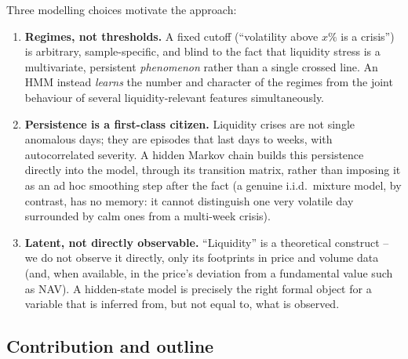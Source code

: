 \documentclass[11pt]{article}
\theoremstyle{definition}
\theoremstyle{remark}
\begin{document}
Three modelling choices motivate the approach:
\begin{enumerate}
    \item \textbf{Regimes, not thresholds.} A fixed cutoff (``volatility above $x\%$ is a crisis'') is arbitrary, sample-specific, and blind to the fact that liquidity stress is a multivariate, persistent \emph{phenomenon} rather than a single crossed line. An HMM instead \emph{learns} the number and character of the regimes from the joint behaviour of several liquidity-relevant features simultaneously.
    \item \textbf{Persistence is a first-class citizen.} Liquidity crises are not single anomalous days; they are episodes that last days to weeks, with autocorrelated severity. A hidden Markov chain builds this persistence directly into the model, through its transition matrix, rather than imposing it as an ad hoc smoothing step after the fact (a genuine i.i.d.\ mixture model, by contrast, has no memory: it cannot distinguish one very volatile day surrounded by calm ones from a multi-week crisis).
    \item \textbf{Latent, not directly observable.} ``Liquidity'' is a theoretical construct -- we do not observe it directly, only its footprints in price and volume data (and, when available, in the price's deviation from a fundamental value such as NAV). A hidden-state model is precisely the right formal object for a variable that is inferred from, but not equal to, what is observed.
\end{enumerate}

\subsection{Contribution and outline}
\end{document}
